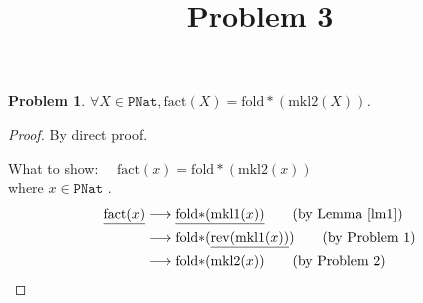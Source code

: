\documentclass[12pt, a4paper]{article}
\title{Problem 3}
\date{\vspace{-5ex}}
\newtheorem{problem}{Problem}
\newcommand{\rmx}[1]{\mathrm{#1}}
\newcommand{\larrow}{\longrightarrow}
\newcommand{\under}{\underline}
\begin{document}
\maketitle

\begin{problem}
$\forall X \in \mathtt{PNat}, \rmx{fact}(X) = \rmx{fold*}(\rmx{mkl2}(X))$.
\end{problem}
\begin{proof}
By direct proof.

\noindent
What to show: $\quad\rmx{fact}(x) = \rmx{fold*}(\rmx{mkl2}(x))$ \\
where $x \in \mathtt{PNat}$ .
\begin{align*}
\under{\rmx{fact}(x)}
	&\larrow \under{\rmx{fold*}(\rmx{mkl1}(x))} \tag{by Lemma~\ref{lm1}} \\
	&\larrow \rmx{fold*}(\under{\rmx{rev}(\rmx{mkl1}(x))}) \tag{by Problem 1} \\
	&\larrow \rmx{fold*}(\rmx{mkl2}(x)) \tag{by Problem 2}
\end{align*}
\end{proof}
\end{document}
